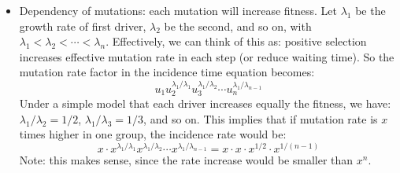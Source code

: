 \documentclass{report}
\begin{document}
\begin{itemize}
	\item Dependency of mutations: each mutation will increase fitness. Let $\lambda_1$ be the growth rate of first driver, $\lambda_2$ be the second, and so on, with $\lambda_1 < \lambda_2 < \cdots < \lambda_n$. Effectively, we can think of this as: positive selection increases effective mutation rate in each step (or reduce waiting time). So the mutation rate factor in the incidence time equation becomes: 
	\begin{equation}
	u_1 u_2^{\lambda_1/\lambda_1} u_3^{\lambda_1/\lambda_2} \cdots u_n^{\lambda_1/\lambda_{n-1}} 
	\end{equation}
	Under a simple model that each driver increases equally the fitness, we have: $\lambda_1 / \lambda_2 = 1/2$, $\lambda_1 / \lambda_3 = 1/3$, and so on. This implies that if mutation rate is $x$ times higher in one group, the incidence rate would be:
	\begin{equation}
	 x \cdot x^{\lambda_1/\lambda_1} x^{\lambda_1/\lambda_2} \cdots x^{\lambda_1/\lambda_{n-1}} = x \cdot x \cdot x^{1/2} \cdot x^{1/(n-1)}
	\end{equation}
	Note: this makes sense, since the rate increase would be smaller than $x^n$. 

\end{itemize}
\end{document}

